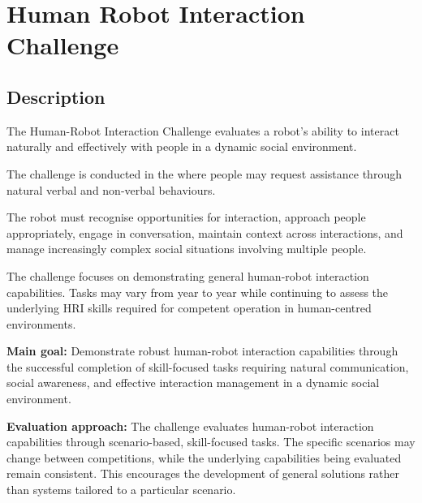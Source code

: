 \section{Human Robot Interaction Challenge}
\label{test:human-robot-interaction-challenge}

\subsection*{Description}
The Human-Robot Interaction Challenge evaluates a robot's ability to interact naturally and effectively with people in a dynamic social environment.

The challenge is conducted in the \Arena{} where people may request assistance through natural verbal and non-verbal behaviours.

The robot must recognise opportunities for interaction, approach people appropriately, engage in conversation, maintain context across interactions, and manage increasingly complex social situations involving multiple people.

The challenge focuses on demonstrating general human-robot interaction capabilities. Tasks may vary from year to year while continuing to assess the underlying HRI skills required for competent operation in human-centred environments.

\medskip
\noindent \textbf{Main goal:}
Demonstrate robust human-robot interaction capabilities through the successful completion of skill-focused tasks requiring natural communication, social awareness, and effective interaction management in a dynamic social environment.

\medskip
\noindent \textbf{Evaluation approach:}
The challenge evaluates human-robot interaction capabilities through scenario-based, skill-focused tasks. The specific scenarios may change between competitions, while the underlying capabilities being evaluated remain consistent. This encourages the development of general solutions rather than systems tailored to a particular scenario.

